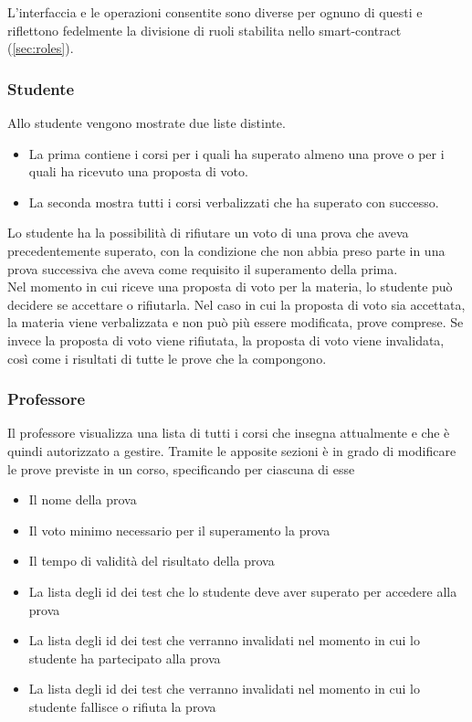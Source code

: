L'interfaccia e le operazioni consentite sono diverse per ognuno di questi e riflettono fedelmente la divisione di ruoli stabilita nello \gls{smart-contract} (\autoref{sec:roles}).

\subsubsection{Studente}

Allo studente vengono mostrate due liste distinte.

\begin{itemize}
    \item La prima contiene i corsi per i quali ha superato almeno una prove o per i quali ha ricevuto una proposta di voto.
    \item La seconda mostra tutti i corsi verbalizzati che ha superato con successo.
\end{itemize}

Lo studente ha la possibilità di rifiutare un voto di una prova che aveva precedentemente superato,
con la condizione che non abbia preso parte in una prova successiva che aveva come requisito il superamento della prima. \\
Nel momento in cui riceve una proposta di voto per la materia, lo studente può decidere se accettare o rifiutarla.
Nel caso in cui la proposta di voto sia accettata, la materia viene verbalizzata e non può più essere modificata, prove comprese.
Se invece la proposta di voto viene rifiutata, la proposta di voto viene invalidata, così come i risultati di tutte le prove che la compongono.

\subsubsection{Professore}

Il professore visualizza una lista di tutti i corsi che insegna attualmente e che è quindi autorizzato a gestire.
Tramite le apposite sezioni è in grado di modificare le prove previste in un corso, specificando per ciascuna di esse

\begin{itemize}
    \item Il nome della prova
    \item Il voto minimo necessario per il superamento la prova
    \item Il tempo di validità del risultato della prova
    \item La lista degli id dei test che lo studente deve aver superato per accedere alla prova
    \item La lista degli id dei test che verranno invalidati nel momento in cui lo studente ha partecipato alla prova
    \item La lista degli id dei test che verranno invalidati nel momento in cui lo studente fallisce o rifiuta la prova
\end{itemize}

